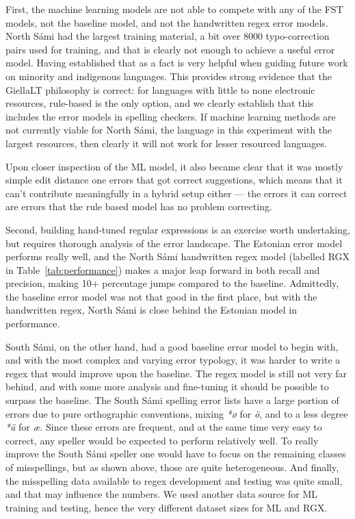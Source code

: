 \documentclass{flammie}
\begin{document}
First, the machine learning models are not able to compete with any of the FST
models, not the baseline model, and not the handwritten regex error models.
North Sámi had the largest training material, a bit over 8000 typo-correction
pairs used for training, and that is clearly not enough to achieve a useful
error model. Having established that as a fact is very helpful when guiding
future work on minority and indigenous languages. This provides strong evidence
that the GiellaLT philosophy is correct: for languages with little to none
electronic resources, rule-based is the only option, and we clearly establish
that this includes the error models in spelling checkers. If machine learning
methods are not currently viable for North Sámi, the language in this experiment
with the largest resources, then clearly it will not work for lesser resourced
languages.

Upon closer inspection of the ML model, it also became clear that it was mostly
simple edit distance one errors that got correct suggestions, which means that
it can't contribute meaningfully in a hybrid setup either --- the errors it can
correct are errors that the rule based model has no problem correcting.

Second, building hand-tuned regular expressions is an exercise worth
undertaking, but requires thorough analysis of the error landscape. The Estonian
error model performs really well, and the North Sámi handwritten regex model
(labelled RGX in Table~\ref{tab:performance}) makes a major leap forward in both
recall and precision, making 10+ percentage jumps compared to the baseline.
Admittedly, the baseline error model was not that good in the first place, but
with the handwritten regex, North Sámi is close behind the Estonian model in
performance.

South Sámi, on the other hand, had a good baseline error model to begin with,
and with the most complex and varying error typology, it was harder to write a
regex that would improve upon the baseline. The regex model is still not very
far behind, and with some more analysis and fine-tuning it should be possible to
surpass the baseline.  The South Sámi spelling error lists have a large portion
of errors due to pure orthographic conventions, mixing \textit{*ø} for
\textit{ö}, and to a less degree \textit{*ä} for \textit{æ}. Since these errors
are frequent, and at the same time very easy to correct, any speller would be
expected to perform relatively well. To really improve the South Sámi speller
one would have to focus on the remaining classes of misspellings, but as shown
above, those are quite heterogeneous. And finally, the misspelling data
available to regex development and testing was quite small, and that may
influence the numbers. We used another data source for ML training and testing,
hence the very different dataset sizes for ML and RGX.\@
\end{document}
